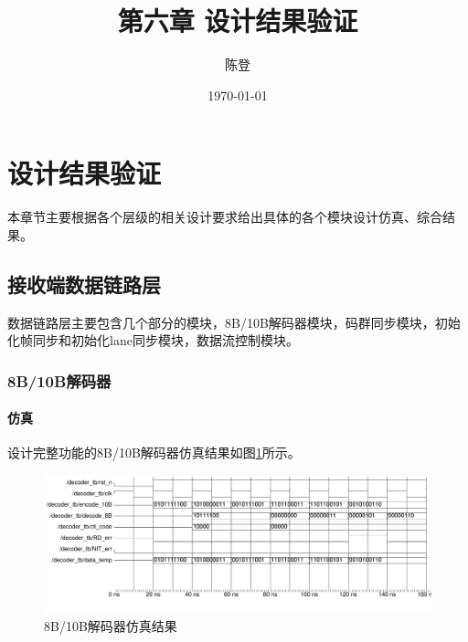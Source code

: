 \documentclass[UTF8]{ctexart}
\title{第六章 设计结果验证}
\author{陈登}
\date{\today}
\begin{document}
\section{设计结果验证}

本章节主要根据各个层级的相关设计要求给出具体的各个模块设计仿真、综合结果。

\subsection{接收端数据链路层}

数据链路层主要包含几个部分的模块，8B/10B解码器模块，码群同步模块，初始化帧同步和初始化lane同步模块，数据流控制模块。

\subsubsection{8B/10B解码器}

\paragraph{仿真}

设计完整功能的8B/10B解码器仿真结果如图\ref{fig:8b_10b_decoder_wave}所示。

\begin{figure}[H]
	\centering
	\includegraphics[width=18cm]{./img/8b_10b_decoder_wave.pdf}
	\caption{8B/10B解码器仿真结果}
	\label{fig:8b_10b_decoder_wave}
\end{figure}
\end{document}
